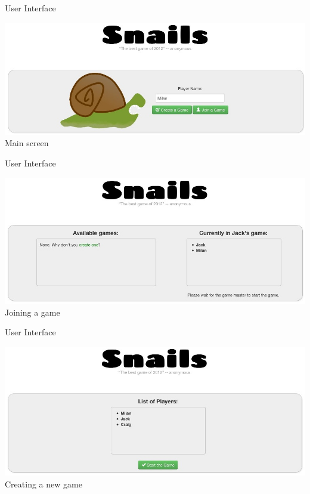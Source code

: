 \documentclass{beamer}
\begin{document}
\begin{frame}{User Interface}
  \begin{center}
    \includegraphics[scale=0.35]{index.jpg} \\
    Main screen
  \end{center}
\end{frame}

\begin{frame}{User Interface}
  \begin{center}
    \includegraphics[scale=0.35]{join.jpg} \\
    Joining a game
  \end{center}
\end{frame}

\begin{frame}{User Interface}
  \begin{center}
    \includegraphics[scale=0.35]{create.jpg} \\
    Creating a new game
  \end{center}
\end{frame}
\end{document}
